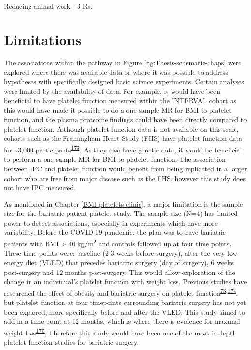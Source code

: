 \documentclass[11pt,twoside]{bristolthesis}
\begin{document}
Reducing animal work - 3 Rs.

\hypertarget{limitations}{%
\section{Limitations}\label{limitations}}

The associations within the pathway in Figure \ref{fig:Thesis-schematic-chaps} were explored where there was available data or where it was possible to address hypotheses with specifically designed basic science experiments. Certain analyses were limited by the availability of data. For example, it would have been beneficial to have platelet function measured within the INTERVAL cohort as this would have made it possible to do a one sample MR for BMI to platelet function, and the plasma proteome findings could have been directly compared to platelet function. Although platelet function data is not available on this scale, cohorts such as the Framingham Heart Study (FHS) have platelet function data for \textasciitilde3,000 participants\textsuperscript{\protect\hyperlink{ref-Rodriguez2020}{173}}. As they also have genetic data, it would be beneficial to perform a one sample MR for BMI to platelet function. The association between IPC and platelet function would benefit from being replicated in a larger cohort who are free from major disease such as the FHS, however this study does not have IPC measured.

As mentioned in Chapter \ref{BMI-platelets-clinic}, a major limitation is the sample size for the bariatric patient platelet study. The sample size (N=4) has limited power to detect associations, especially in experiments which have more variability. Before the COVID-19 pandemic, the plan was to have bariatric patients with BMI \textgreater{} 40 kg/m\textsuperscript{2} and controls followed up at four time points. These time points were: baseline (2-3 weeks before surgery), after the very low energy diet (VLED) that precedes bariatric surgery (day of surgery), 6 weeks post-surgery and 12 months post-surgery. This would allow exploration of the change in an individual's platelet function with weight loss. Previous studies have researched the effect of obesity and bariatric surgery on platelet function\textsuperscript{\protect\hyperlink{ref-Barrachina2019}{73},\protect\hyperlink{ref-Dobrydneva2012}{174}}, but platelet function at four timepoints surrounding bariatric surgery has not yet been explored, more specifically before and after the VLED. This study aimed to add in a time point at 12 months, which is where there is evidence for maximal weight loss\textsuperscript{\protect\hyperlink{ref-Maciejewski2016}{175}}. Therefore this study would have been one of the most in depth platelet function studies for bariatric surgery.
\end{document}
